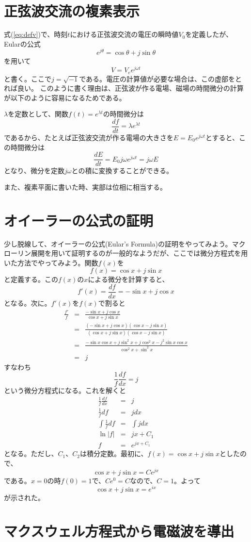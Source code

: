 \section{正弦波交流の複素表示}
式(\ref{eq:defv})で、時刻$t$における正弦波交流の電圧の瞬時値$V_0$を定義したが、
Eularの公式
\[
e^{j\theta} = \cos\theta + j\sin\theta
\]
を用いて
\begin{equation}
V = V_e e^{j\omega t}
\end{equation}
と書く。ここで$j=\sqrt{-1}$である。電圧の計算値が必要な場合は、この虚部をとれば良い。
このように書く理由は、正弦波が作る電場、磁場の時間微分の計算が以下のように容易になるためである。

$\lambda$を定数として、関数$f(t)=e^{\lambda t}$の時間微分は
\[
\frac{df}{dt}=\lambda e^{\lambda t}
\]
であるから、たとえば正弦波交流が作る電場の大きさを$E=E_0e^{j\omega t}$とすると、この時間微分は
\[
\frac{dE}{dt} = E_0 j\omega e^{j \omega t} = j\omega E
\]
となり、微分を定数$j\omega$との積に変換することができる。

また、複素平面に書いた時、実部は位相に相当する。

\section{オイーラーの公式の証明}
少し脱線して、オイーラーの公式(Eular's Formula)の証明をやってみよう。マクローリン展開を用いて証明するのが一般的なようだが、ここでは微分方程式を用いた方法でやってみよう。関数$f(x)$を
\[
f(x) = \cos x + j\sin x
\]
と定義する。この$f(x)$の$x$による微分を計算すると、
\[
f'(x) = \frac{df}{dx} = -\sin x + j\cos x
\]
となる。次に。$f'(x)$を$f(x)$で割ると
\begin{eqnarray*}
\frac{f'}{f} &=& \frac{-\sin x + j\cos x}{\cos x + j\sin x}\\
&=&\frac{(-\sin x + j\cos x)(\cos x - j\sin x)}{(\cos x + j\sin x)(\cos x - j\sin x)}\\
&=&\frac{-\sin x \cos x + j\sin^2 x + j\cos^2 x -j^2\sin x \cos x}{\cos^2 x + \sin^2 x}\\
&=&j
\end{eqnarray*}
すなわち
\[
\frac{1}{f}\frac{df}{dx} = j
\]
という微分方程式になる。これを解くと
\begin{eqnarray*}
\frac{1}{f}\frac{df}{dx} &=& j\\
\frac{1}{f}df &=& jdx\\
\int \frac{1}{f} df &=& \int j dx\\
\ln|f| &=& jx + C_1\\
f &=& e^{jx+C_1}
\end{eqnarray*}
となる。ただし、$C_1$、$C_2$は積分定数。最初に、$f(x)=\cos x + j\sin x$としたので、
\[
\cos x + j\sin x = C e^{jx}
\]
である。$x=0$の時$f(0) = 1$で、$C e^{0} = C$なので、$C=1$。よって
\[
\cos x + j\sin x = e^{ix}
\]
が示された。

\section{マクスウェル方程式から電磁波を導出}
